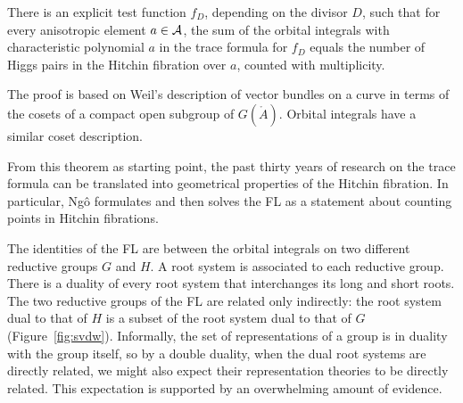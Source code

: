 \begin{thm}[Ng\^o] There is an explicit
  test function $f_D$, depending on the divisor $D$,
  such that for every anisotropic element $a\in\AA$, the
  sum of the orbital integrals with characteristic polynomial $a$  
  in the trace formula for $f_D$ 
  equals
  the number of Higgs pairs in the Hitchin fibration over $a$,
  counted with multiplicity.
\end{thm}

The proof is based on Weil's description of vector bundles on a curve
in terms of the cosets of a compact open subgroup of $G(\ring{A})$. 
Orbital integrals have a similar coset description.

From this theorem as starting point, the past thirty years of research
on the trace formula can be translated into geometrical properties of
the Hitchin fibration.  In particular, Ng\^o formulates and then solves
the FL as a statement about counting points in Hitchin
fibrations.  

The identities of the FL are between the orbital integrals on two
different reductive groups $G$ and $H$.  A root system is associated
to each reductive group.  There is a duality of every root system that
interchanges its long and short roots.  The two reductive
groups of the FL are related
only indirectly: the root system dual to that of $H$ is a subset of
the root system dual to that of $G$ (Figure~\ref{fig:svdw}).  Informally, the set
of representations of a group is in duality with the group itself, so
by a double duality, when the dual root systems are directly related,
we might also expect their representation theories to be directly
related.  This expectation is supported by an overwhelming amount
of evidence.

